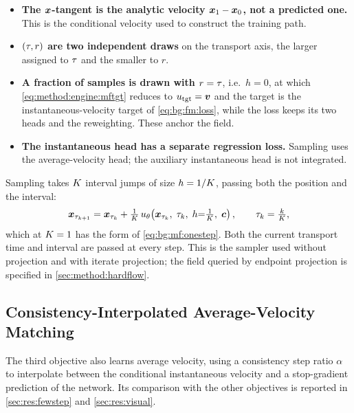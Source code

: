 \begin{itemize}
  \item \textbf{The $\boldsymbol{x}$-tangent is the analytic velocity $\boldsymbol{x}_{1}-\boldsymbol{x}_{0}$, not a
    predicted one.} This is the conditional velocity used to construct the training path.
  \item \textbf{$(\tau,r)$ are two independent draws} on the transport axis, the larger
    assigned to $\tau$ and the smaller to $r$.
  \item \textbf{A fraction of samples is drawn with $r = \tau$}, i.e.\ $h=0$, at which
    \eqref{eq:method:engine:mftgt} reduces to $u_{\textrm{tgt}} = \boldsymbol{v}$ and the target
    is the instantaneous-velocity target of \eqref{eq:bg:fm:loss}, while the loss keeps its two heads and the
    reweighting. These anchor the field.
  \item \textbf{The instantaneous head has a separate regression loss.} Sampling uses the
    average-velocity head; the auxiliary instantaneous head is not integrated.
\end{itemize}

Sampling takes $K$ interval jumps of size $h=1/K$, passing both the position and the
interval:
\begin{equation}\label{eq:method:engine:mfsample}
  \boldsymbol{x}_{\tau_{k+1}} = \boldsymbol{x}_{\tau_{k}}
    + \tfrac{1}{K}\,u_{\theta}\!\left(\boldsymbol{x}_{\tau_{k}},\;\tau_{k},\;h{=}\tfrac{1}{K},\;\boldsymbol{c}\right),
  \qquad \tau_{k} = \tfrac{k}{K},
\end{equation}
which at $K=1$ has the form of \eqref{eq:bg:mf:onestep}. Both the current transport time
and interval are passed at every step. This is the sampler used without projection and with iterate
projection; the field queried by endpoint projection is specified in \autoref{sec:method:hardflow}.

\subsection{Consistency-Interpolated Average-Velocity Matching}\label{sec:method:alphaflow}

The third objective \parencite{zhang2025alphaflow} also learns average velocity, using a consistency
step ratio $\alpha$ to interpolate between the conditional instantaneous velocity and a
stop-gradient prediction of the network. Its comparison with the other objectives is reported in
\autoref{sec:res:fewstep} and \autoref{sec:res:visual}.

